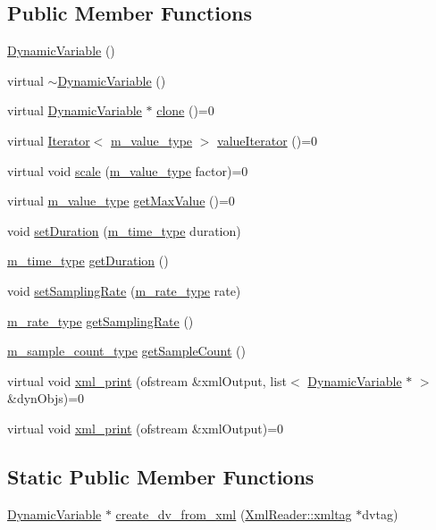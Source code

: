\subsection*{Public Member Functions}
\begin{CompactItemize}
\item 
\hyperlink{classDynamicVariable_a0}{Dynamic\-Variable} ()
\item 
virtual \hyperlink{classDynamicVariable_a1}{$\sim$Dynamic\-Variable} ()
\item 
virtual \hyperlink{classDynamicVariable}{Dynamic\-Variable} $\ast$ \hyperlink{classDynamicVariable_a2}{clone} ()=0
\item 
virtual \hyperlink{classIterator}{Iterator}$<$ \hyperlink{Types_8h_a3}{m\_\-value\_\-type} $>$ \hyperlink{classDynamicVariable_a3}{value\-Iterator} ()=0
\item 
virtual void \hyperlink{classDynamicVariable_a4}{scale} (\hyperlink{Types_8h_a3}{m\_\-value\_\-type} factor)=0
\item 
virtual \hyperlink{Types_8h_a3}{m\_\-value\_\-type} \hyperlink{classDynamicVariable_a5}{get\-Max\-Value} ()=0
\item 
void \hyperlink{classDynamicVariable_a6}{set\-Duration} (\hyperlink{Types_8h_a2}{m\_\-time\_\-type} duration)
\item 
\hyperlink{Types_8h_a2}{m\_\-time\_\-type} \hyperlink{classDynamicVariable_a7}{get\-Duration} ()
\item 
void \hyperlink{classDynamicVariable_a8}{set\-Sampling\-Rate} (\hyperlink{Types_8h_a4}{m\_\-rate\_\-type} rate)
\item 
\hyperlink{Types_8h_a4}{m\_\-rate\_\-type} \hyperlink{classDynamicVariable_a9}{get\-Sampling\-Rate} ()
\item 
\hyperlink{Types_8h_a1}{m\_\-sample\_\-count\_\-type} \hyperlink{classDynamicVariable_a10}{get\-Sample\-Count} ()
\item 
virtual void \hyperlink{classDynamicVariable_a11}{xml\_\-print} (ofstream \&xml\-Output, list$<$ \hyperlink{classDynamicVariable}{Dynamic\-Variable} $\ast$ $>$ \&dyn\-Objs)=0
\item 
virtual void \hyperlink{classDynamicVariable_a12}{xml\_\-print} (ofstream \&xml\-Output)=0
\end{CompactItemize}
\subsection*{Static Public Member Functions}
\begin{CompactItemize}
\item 
\hyperlink{classDynamicVariable}{Dynamic\-Variable} $\ast$ \hyperlink{classDynamicVariable_e0}{create\_\-dv\_\-from\_\-xml} (\hyperlink{classXmlReader_1_1xmltag}{Xml\-Reader::xmltag} $\ast$dvtag)
\end{CompactItemize}
